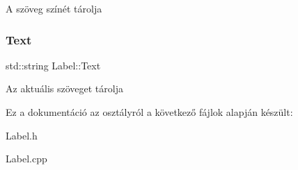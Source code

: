 A szöveg színét tárolja \mbox{\label{class_label_a74410e9b43ea90d40c828008e5904f95}} 
\subsubsection{\texorpdfstring{Text}{Text}}
{\footnotesize\ttfamily std\+::string Label\+::\+Text\hspace{0.3cm}{\ttfamily [protected]}}

Az aktuális szöveget tárolja 

Ez a dokumentáció az osztályról a következő fájlok alapján készült\+:\begin{DoxyCompactItemize}
\item 
Label.\+h\item 
Label.\+cpp\end{DoxyCompactItemize}
